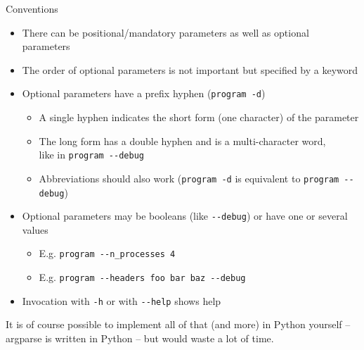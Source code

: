 \begin{frame}{Conventions}
%
\begin{itemize}
\item There can be positional/mandatory parameters as well as optional parameters
\item The order of optional parameters is not important but specified by a keyword
\item Optional parameters have a prefix hyphen (\zB \texttt{program -d})
	\begin{itemize}
	\item A single hyphen indicates the short form (one character) of the parameter
	\item The long form has a double hyphen and is a multi-character word, \\
		like in \texttt{program -{}-debug}
	\item Abbreviations should also work (\texttt{program -d} is equivalent to \texttt{program -{}-debug})
	\end{itemize}
\item Optional parameters may be booleans (like \texttt{-{}-debug}) or have one or several values
	\begin{itemize}
	\item E.\;g. \texttt{program -{}-n\_processes 4} 
	\item E.\;g. \texttt{program -{}-headers foo bar baz -{}-debug}
	\end{itemize}
\item Invocation with \texttt{-h} or with \texttt{-{}-help} shows help
\end{itemize}
%
\begin{warnbox}
\footnotesize
It is of course possible to implement all of that (and more) in Python yourself -- argparse is written in Python -- but would waste a lot of time.
\end{warnbox}
%
\end{frame}


